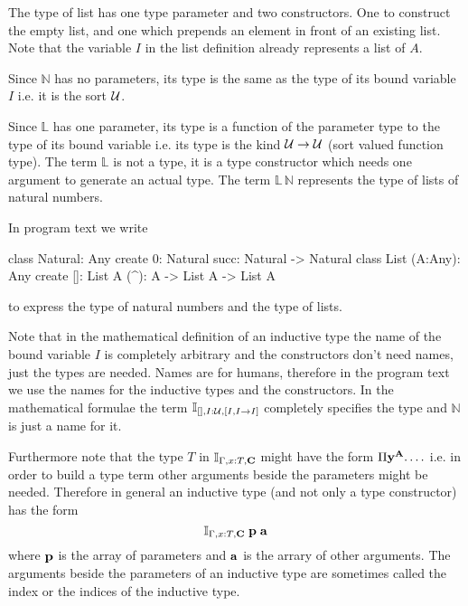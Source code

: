 \begin{description}
  The type of list has one type parameter and two constructors. One to
  construct the empty list, and one which prepends an element in front of an
  existing list. Note that the variable $I$ in the list definition already
  represents a list of $A$.

  Since $\mathbb{N}$ has no parameters, its type is the same as the type of
  its bound variable $I$ i.e. it is the sort ${\cal{U}}$.

  Since $\mathbb{L}$ has one parameter, its type is a function of the
  parameter type to the type of its bound variable i.e. its type is the kind
  ${\cal{U}} \to {\cal{U}}$ (sort valued function type). The term $\mathbb{L}$ is not a
  type, it is a type constructor which needs one argument to generate an
  actual type. The term $\mathbb{L} \, \mathbb{N}$ represents the type of
  lists of natural numbers.

  In program text we write
  \begin{alba}
      class Natural: Any create
        0: Natural
        succ: Natural -> Natural
      class List (A:Any): Any create
        []: List A
        (^): A -> List A -> List A
  \end{alba}
  to express the type of natural numbers and the type of lists.

  Note that in the mathematical definition of an inductive type the name of
  the bound variable $I$ is completely arbitrary and the constructors don't
  need names, just the types are needed. Names are for humans, therefore in
  the program text we use the names for the inductive types and the
  constructors. In the mathematical formulae the term
  $\mathbb{I}_{[], I:{\cal{U}}, [I, I \to I]}$ completely specifies the type and
  $\mathbb{N}$ is just a name for it.

  Furthermore note that the type $T$ in $\mathbb{I}_{\Gamma, x:T, \mathbf{C}}$
  might have the form $\Pi \mathbf{y}^{\mathbf{A}}. \ldots$ i.e. in order to build a
  type term other arguments beside the parameters might be needed. Therefore
  in general an inductive type (and not only a type constructor) has the form
  $$
  \mathbb{I}_{\Gamma, x:T, \mathbf{C}} \; \mathbf{p} \; \mathbf{a}
  $$
  where $\mathbf{p}$ is the array of parameters and $\mathbf{a}$ is the arrary of
  other arguments. The arguments beside the parameters of an inductive type
  are sometimes called the index or the indices of the inductive type.



\end{description}
